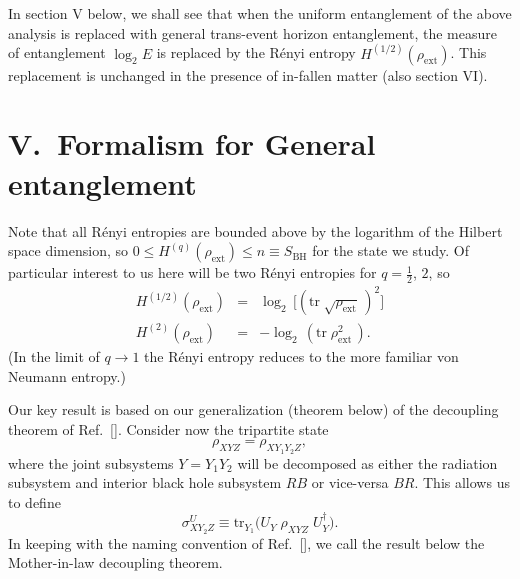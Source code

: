 \documentclass[twocolumn,aps,showpacs,prl]{revtex4}
\begin{document}
In section V below, we shall see that when the uniform entanglement of
the above analysis is replaced with general trans-event horizon
entanglement, the measure of entanglement $\log_2 E$ is replaced by
the R\'enyi entropy $H^{(1/2)}(\rho_{\text{ext}})$. This replacement
is unchanged in the presence of in-fallen matter (also section VI).

\section{V.\ Formalism for General entanglement}
\label{decoupling}

Note that all R\'enyi entropies are bounded above by the logarithm of
the Hilbert space dimension, so
 $0\le H^{(q)}(\rho_{\text{ext}})\le n\equiv S_{\text{BH}}$
for the state we study. Of particular interest to us here will be two
R\'enyi entropies for $q=\frac{1}{2}$, $2$, so
\begin{eqnarray}
H^{(1/2)}(\rho_{\text{ext}}) &=&\log_2
 \,\bigl[({\text{tr}}\;\sqrt{\rho_{\text{ext}}}\,)^2\bigr] \nonumber \\
H^{(2)}(\rho_{\text{ext}}) &=&-\log_2
\,({\text{tr}}\;{\rho^2_{\text{ext}}}\,).
\end{eqnarray}
(In the limit of $q\rightarrow 1$ the R\'enyi entropy reduces to the
more familiar von Neumann entropy.)

Our key result is based on our generalization (theorem below) of the
decoupling theorem of Ref.~[]. Consider now the
tripartite state
\begin{equation}
\rho_{XYZ}^{\text{~}}=
\rho_{XY_1Y_2Z}^{\text{~}},
\end{equation}
where the joint subsystems $Y=Y_1Y_2$ will be decomposed as either
the radiation subsystem and interior black hole subsystem $RB$ or vice-versa
$BR$. This allows us to define
\begin{equation}
\sigma_{XY_2Z}^U\equiv
\text{tr}_{Y_1}^{\text{~}} \bigl(U_{Y}\;
\rho_{XYZ}^{\text{~}}\; U_{Y}^\dagger\bigr).
\end{equation}
In keeping with the naming convention of Ref.~[],
we call the result below the Mother-in-law decoupling theorem.

\end{document}
